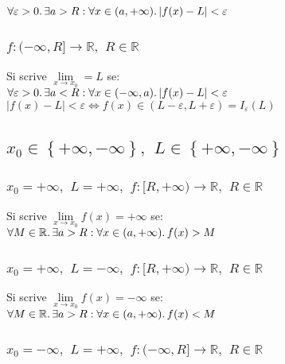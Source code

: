 \documentclass[a4paper, twoside, italian, 11pt]{book}
\newcommand{\braces}[1] {\left \{ #1 \right \}}
\newcommand{\abs}[1] {\left | #1 \right |}
\newcommand{\R}{\mathbb{R}}
\begin{document}
\noindent
$\forall \varepsilon > 0 \ldotp \exists a > R : \forall x \in (a, +\infty) \ldotp \abs{f(x) - L} < \varepsilon$


\subsubsection{$f: (-\infty, R] \rightarrow \R,$ $R \in \R$}

\noindent
Si scrive $\lim\limits_{x \to x_0} = L$ se: \\

\noindent
$\forall \varepsilon > 0 \ldotp \exists a < R : \forall x \in (-\infty, a) \ldotp \abs{f(x) - L} < \varepsilon$ \\

\noindent
$\abs{f(x) - L} < \varepsilon \iff f(x) \in (L - \varepsilon, L + \varepsilon) = I_\varepsilon(L)$


\subsection{$x_0 \in \braces{+\infty, -\infty},$ $L \in \braces{+\infty, -\infty}$}


\subsubsection{$x_0 = +\infty,$ $L = +\infty,$ $f : [R, +\infty) \rightarrow \R,$ $R \in \R$}

\noindent
Si scrive $\lim\limits_{x \to x_0} f(x) = +\infty$ se: \\

\noindent
$\forall M \in \R \ldotp \exists a > R : \forall x \in (a, +\infty) \ldotp f(x) > M$


\subsubsection{$x_0 = +\infty,$ $L = -\infty,$ $f : [R, +\infty) \rightarrow \R,$ $R \in \R$}

\noindent
Si scrive $\lim\limits_{x \to x_0} f(x) = -\infty$ se: \\

\noindent
$\forall M \in \R \ldotp \exists a > R : \forall x \in (a, +\infty) \ldotp f(x) < M$


\subsubsection{$x_0 = -\infty,$ $L = +\infty,$ $f : (-\infty, R] \rightarrow \R,$ $R \in \R$}
\end{document}
